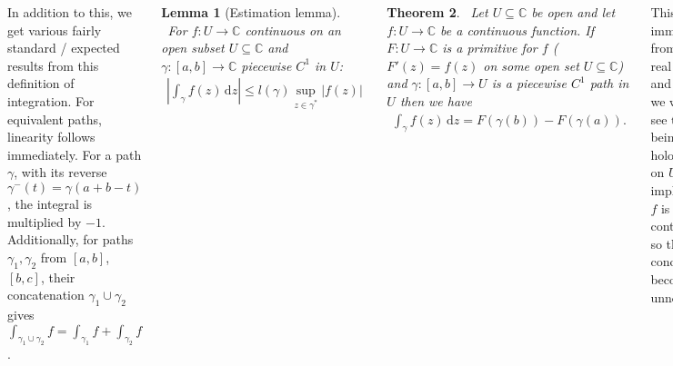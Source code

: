 \documentclass{tikzposter} %
\newtheorem{theorem}{Theorem}
\newtheorem{lemma}[theorem]{Lemma}
\begin{document}
\begin{columns}
{  In addition to this, we get various fairly standard / expected results from this definition of integration. For equivalent paths, linearity follows immediately. For a path $\gamma$, with its reverse $\gamma^{-}(t) = \gamma(a+b-t)$, the integral is multiplied by $-1$. Additionally, for paths $\gamma_{1}, \gamma_{2}$ from $[a,b]$, $[b,c]$, their concatenation $\gamma_{1} \cup \gamma_{2}$ gives $\int_{\gamma_{1} \cup \gamma_{2}} f = \int_{\gamma_{1}} f + \int_{\gamma_{2}} f$.\\

  \begin{lemma}[Estimation lemma]
    \ For $f : U \to \mathbb{C}$ continuous on an open subset $U \subseteq \mathbb{C}$ and $\gamma : [a,b] \to \mathbb{C}$ piecewise $C^{1}$ in $U$:
    \begin{align*}
      \left|\int_{\gamma} f(z) \, \mathrm{d}z \right| \le l(\gamma)\sup_{z \in \gamma^{*}} |f(z)|
    \end{align*}
  \end{lemma}
  \hphantom{}

  \begin{theorem}
  \ Let $U \subseteq \mathbb{C}$ be open and let $f : U \to \mathbb{C}$ be a continuous function. If $F : U \to \mathbb{C}$ is a primitive for $f$ ($F'(z) = f(z)$ on some open set $U \subseteq \mathbb{C}$) and $\gamma : [a,b] \to U$ is a piecewise $C^{1}$ path in $U$ then we have
    \begin{align*}
      \int_{\gamma} f(z) \, \mathrm{d} z = F(\gamma(b)) - F(\gamma(a)).
    \end{align*}
  \end{theorem}
  \hphantom{}

  This follows immediately from the real FTC, and indeed we will later see that $F$ being holomorphic on $U$ implies that $f$ is continuous, so that condition becomes unnecessary. \\

  \begin{theorem}
  \ If $U$ is a domain and $f : U \to \mathbb{C}$ is a continuous function such that for any closed piecewise $C^{1}$ path in $U$ we have $\int_{\gamma} f(z) \, \mathrm{d}z = 0$, then $f$ has a primitive.
  \end{theorem}
  \hphantom{}

  \begin{lemma}
  \ Suppose $f_{n} \overset{u}{\to} f$ on $\gamma$. Then
    \begin{align*}
      \lim_{n \to \infty} \int_{\gamma} f_{n}(z) \, \mathrm{d}z &= \int_{\gamma} f(z) \, \mathrm{d}z
    \end{align*}
  \end{lemma}
  \hphantom{}

}
\end{columns}
\end{document}
